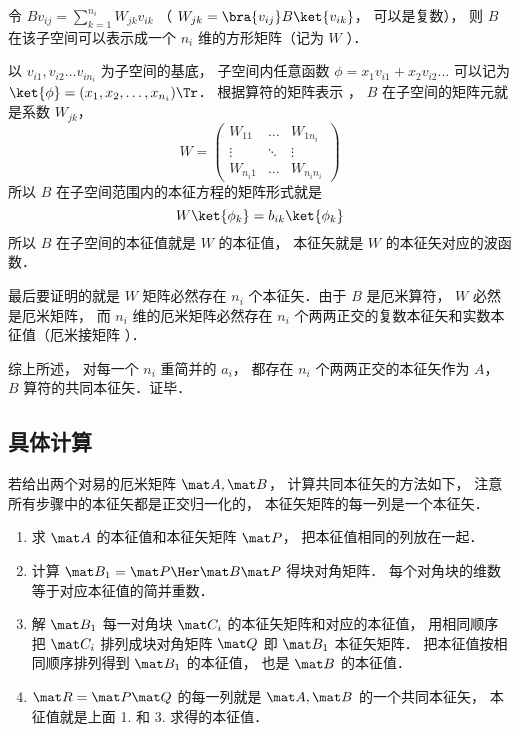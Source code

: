 令 $B v_{ij} = \sum_{k=1}^{n_i} W_{jk}v_{ik}$ （ $W_{jk} = \bra{v_{ij}} B \ket{v_{ik}}$， 可以是复数）， 则 $B$ 在该子空间可以表示成一个 $n_i$ 维的方形矩阵（记为 $W$ ）．

以 $v_{i1}, v_{i2} \dots v_{i n_i}$ 为子空间的基底， 子空间内任意函数 $\phi  = x_1 v_{i1} + x_2 v_{i2}\dots$ 可以记为 $\ket{\phi} = (x_1, x_2, \dots, x_{n_i})\Tr$． 根据算符的矩阵表示
， $B$ 在子空间的矩阵元就是系数 $W_{jk}$， 
\begin{equation}
W = \begin{pmatrix}
W_{11} & \ldots & W_{1 n_i}\\
\vdots & \ddots & \vdots \\
W_{n_i 1} & \ldots & W_{n_i n_i}
\end{pmatrix}
\end{equation}
所以 $B$ 在子空间范围内的本征方程的矩阵形式就是
\begin{equation}
W \ket{\phi_k} = b_{ik} \ket{\phi_k}
\end{equation}
所以 $B$ 在子空间的本征值就是 $W$ 的本征值， 本征矢就是 $W$ 的本征矢对应的波函数．

最后要证明的就是 $W$ 矩阵必然存在 $n_i$ 个本征矢．由于 $B$ 是厄米算符，  $W$ 必然是厄米矩阵， 而 $n_i$ 维的厄米矩阵必然存在 $n_i$ 个两两正交的复数本征矢和实数本征值（厄米接矩阵%
）．

综上所述， 对每一个 $n_i$ 重简并的 $a_i$，  都存在 $n_i$ 个两两正交的本征矢作为 $A$，  $B$ 算符的共同本征矢．证毕．

\subsection{具体计算}
若给出两个对易的厄米矩阵 $\mat A, \mat B$， 计算共同本征矢的方法如下， 注意所有步骤中的本征矢都是正交归一化的， 本征矢矩阵的每一列是一个本征矢．
\begin{enumerate}
\item 求 $\mat A$ 的本征值和本征矢矩阵 $\mat P$， 把本征值相同的列放在一起．
\item 计算 $\mat B_1 = \mat P\Her \mat B\mat P$ 得块对角矩阵． 每个对角块的维数等于对应本征值的简并重数．
\item 解 $\mat B_1$ 每一对角块 $\mat C_i$ 的本征矢矩阵和对应的本征值， 用相同顺序把 $\mat C_i$ 排列成块对角矩阵 $\mat Q$ 即 $\mat B_1$ 本征矢矩阵． 把本征值按相同顺序排列得到 $\mat B_1$ 的本征值， 也是 $\mat B$ 的本征值．
\item $\mat R = \mat P\mat Q$ 的每一列就是 $\mat A, \mat B$ 的一个共同本征矢， 本征值就是上面 1. 和 3. 求得的本征值．
\end{enumerate}

